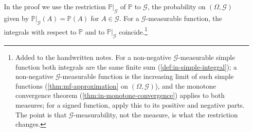In the proof we use the restriction $\mathbb P|_{\mathcal G}$ of $\mathbb P$ to $\mathcal G$, the
probability on $(\Omega,\mathcal G)$ given by $\mathbb P|_{\mathcal G}(A)=\mathbb P(A)$ for
$A\in\mathcal G$. For a $\mathcal G$-measurable function, the integrals with respect to
$\mathbb P$ and to $\mathbb P|_{\mathcal G}$ coincide.\footnote{Added to the handwritten notes.
For a non-negative $\mathcal G$-measurable simple function both integrals are the same finite
sum (\cref{def:in-simple-integral}); a non-negative $\mathcal G$-measurable function is the
increasing limit of such simple functions (\cref{thm:mf-approximation} on $(\Omega,\mathcal G)$),
and the monotone convergence theorem (\cref{thm:in-monotone-convergence}) applies to both
measures; for a signed function, apply this to its positive and negative parts. The point is
that $\mathcal G$-measurability, not the measure, is what the restriction changes.}

